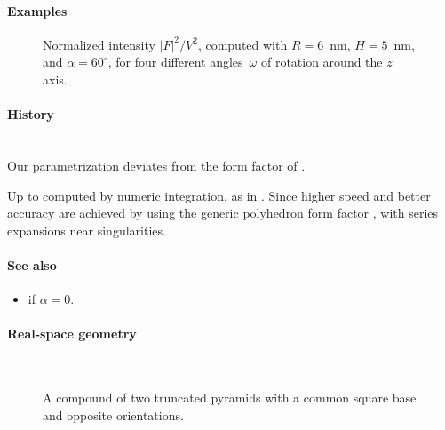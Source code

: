 \paragraph{Examples}\strut

\begin{figure}[H]
\begin{center}
\end{center}
\caption{Normalized intensity $|F|^2/V^2$,
computed with $R=6$~nm, $H=5$~nm, and $\alpha=60^\circ$,
for four different angles~$\omega$ of rotation around the $z$ axis.}
\end{figure}

\paragraph{History}\strut\\
Our parametrization deviates from the form factor  of \IsGISAXS
\cite[Eq.~2.32]{Laz06} \cite[Eq.~222]{ReLL09}.

Up to  computed by numeric integration, as in \IsGISAXS.
Since  higher speed and better accuracy are achieved
by using the generic polyhedron form factor \cite{Wut17},
with series expansions near singularities.

\paragraph{See also}
\begin{itemize}
\item {} if $\alpha=0$.
\end{itemize}


 \label{SCuboctahedron}

\paragraph{Real-space geometry}\strut\\

\begin{figure}[H]
\hfill
{}
\hfill
{}
\hfill
{}
\hfill
\caption{A compound of two truncated pyramids with a common square base
and opposite orientations.}
\end{figure}

